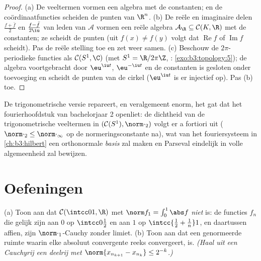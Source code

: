 \begin{proof}
(a) De veeltermen vormen een algebra met de constanten; en de
coördinaatfuncties scheiden de punten van $\R^n$.
(b) De reële en imaginaire delen $\frac{f + \bar f}2$ en $\frac{f
- \bar f}{2\iu}$ van leden van $\mathcal A$ vormen een reële
algebra $\mathcal A_\R \subseteq \mathcal C(K, \R)$ met de
constanten; ze scheidt de punten (uit $f(x) \ne f(y)$ volgt dat
$\operatorname{Re}f$ of $\operatorname{Im}f$ scheidt). Pas de
reële stelling toe en zet weer samen.
(c) Beschouw de $2\pi$-periodieke functies als $\mathcal C(S^1,
\C)$ (met $S^1 = \R/2\pi\Z$, :
\cref{exo:b3:topology:5}); de algebra voortgebracht door
$\eu^{\iu t}$, $\eu^{-\iu t}$ en de constanten is gesloten onder
toevoeging en scheidt de punten van de cirkel ($\eu^{\iu t}$ is er
injectief op). Pas (b) toe.
\end{proof}

\begin{remark}\label{rem:b3:complete:swremark}
De trigonometrische versie repareert, en veralgemeent enorm, het
gat dat het fourierhoofdstuk van bachelorjaar 2 openliet: de
dichtheid van de trigonometrische veeltermen in $(\mathcal C(S^1),
\norm\cdot_2)$ volgt er a fortiori uit ($\norm\cdot_2 \leq
\norm\cdot_\infty$ op de normeringsconstante na), wat van het
fouriersysteem in \cref{ch:b3:hilbert} een orthonormale
\emph{basis} zal maken en Parseval eindelijk in volle
algemeenheid zal bewijzen.
\end{remark}

\section{Oefeningen}

\begin{exercise}[$\star$]\label{exo:b3:complete:1}
(a) Toon aan dat $\mathcal C(\intcc01, \R)$ met $\norm f_1 =
\int_0^1\abs f$ \emph{niet}  is: de functies $f_n$ die
gelijk zijn aan $0$ op $\intcc0{\frac12}$ en aan $1$ op
$\intcc{\frac12 + \frac1n}1$, en daartussen affien, zijn
$\norm\cdot_1$-Cauchy zonder  limiet.
(b) Toon aan dat een genormeerde ruimte waarin elke absoluut
convergente reeks convergeert,  is. \emph{(Haal uit een
Cauchyrij een deelrij met $\norm{x_{n_{k+1}} - x_{n_k}} \leq
2^{-k}$.)}
\end{exercise}

